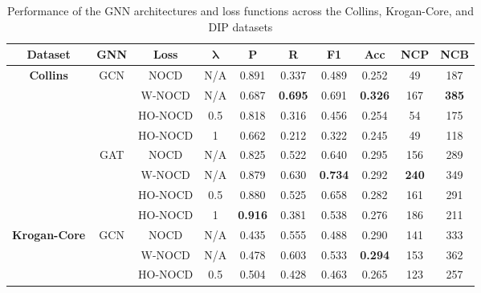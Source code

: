 \begin{table}[h]
	\centering
	\caption{Performance of the GNN architectures and loss functions across the Collins, Krogan-Core, and DIP datasets}
	\vspace{2mm}
	\label{table:loss_arch_results}
	\footnotesize
	\vspace{2mm}
	\begin{tabular}{c| c c c | c c c c c c}
		\hline
		\textbf{Dataset} & \textbf{GNN} & \textbf{Loss} & $\boldsymbol{\lambda}$
		& \textbf{P} & \textbf{R} & \textbf{F1} & \textbf{Acc} & \textbf{NCP} & \textbf{NCB}
		\\
		\hline
		
		\multirow{8}{*}{\textbf{Collins}}
		& \multirow{4}{*}{GCN}
		& NOCD & N/A
		& 0.891 & 0.337 & 0.489 & 0.252 & 49 & 187
		\\
		
		& & W-NOCD & N/A
		& 0.687 & \textbf{0.695} & 0.691 & \textbf{0.326} & 167 & \textbf{385}
		\\
		
		& & HO-NOCD & 0.5
		& 0.818 & 0.316 & 0.456 & 0.254 & 54 & 175
		\\
		
		& & HO-NOCD & 1
		& 0.662 & 0.212 & 0.322 & 0.245 & 49 & 118
		\\
		\cline{2-10}
		
		& \multirow{4}{*}{GAT}
		& NOCD & N/A
		& 0.825 & 0.522 & 0.640 & 0.295 & 156 & 289
		\\
		
		& & W-NOCD & N/A
		& 0.879 & 0.630 & \textbf{0.734} & 0.292 & \textbf{240} & 349
		\\
		
		& & HO-NOCD & 0.5
		& 0.880 & 0.525 & 0.658 & 0.282 & 161 & 291
		\\
		
		& & HO-NOCD & 1
		& \textbf{0.916} & 0.381 & 0.538 & 0.276 & 186 & 211
		\\
		
		\hline
		
		\multirow{8}{*}{\textbf{Krogan-Core}}
		& \multirow{4}{*}{GCN}
		& NOCD & N/A
		& 0.435 & 0.555 & 0.488 & 0.290 & 141 & 333
		\\
		
		& & W-NOCD & N/A
		& 0.478 & 0.603 & 0.533 & \textbf{0.294} & 153 & 362
		\\
		
		& & HO-NOCD & 0.5
		& 0.504 & 0.428 & 0.463 & 0.265 & 123 & 257
		\\
		

\end{tabular}
\end{table}
